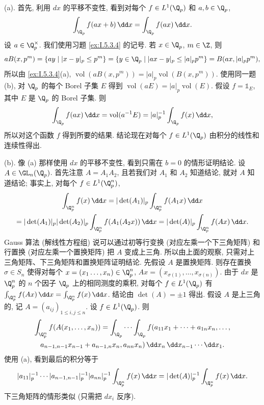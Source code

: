 \begin{solution}
(a). 首先, 利用 $dx$ 的平移不变性, 看到对每个 $f \in L^1(\Q_p)$ 和 $a, b \in \Q_p$,
\[
\int_{\Q_p}f(ax + b)\,\dd x = \int_{\Q_p}f(ax)\,\dd x.
\]
设 $a \in \Q_p^{\times}$. 我们使用习题 \ref{ex:I.5.3.4} 的记号. 若 $x \in \Q_p$, $m \in \Z$, 则
\[
aB(x, p^m) = \{ay \mid |x - y|_p \leq p^m\} = \{y \in \Q_p \mid |ax - y|_p \leq |a|_pp^m\} = B(ax, |a|_pp^m),
\]
所以由 \ref{ex:I.5.3.4}(a), $\operatorname{vol}(aB(x, p^m)) = |a|_p\operatorname{vol}(B(x, p^m))$. 使用同一题 (b), 对 $\Q_p$ 的每个 Borel 子集 $E$ 得到 $\operatorname{vol}(aE) = |a|_p\operatorname{vol}(E)$. 假设 $f = \mathbb{1}_E$, 其中 $E$ 是 $\Q_p$ 的 Borel 子集. 则
\[
\int_{\Q_p}f(ax)\,\dd x = \operatorname{vol}(a^{-1}E) = |a|_p^{-1}\int_{\Q_p}f(x)\,\dd x,
\]
所以对这个函数 $f$ 得到所要的结果. 结论现在对每个 $f \in L^1(\Q_p)$ 由积分的线性和连续性得出.

(b). 像 (a) 那样使用 $dx$ 的平移不变性, 看到只需在 $b = 0$ 的情形证明结论. 设 $A \in \GL_n(\Q_p)$. 首先注意 $A = A_1A_2$, 且若我们对 $A_1$ 和 $A_2$ 知道结论, 就对 $A$ 知道结论; 事实上, 对每个 $f \in L^1(\Q_p^n)$,
\begin{multline*}
\int_{\Q_p^n}f(x)\,\dd x = |\det(A_1)|_p\int_{\Q_p^n}f(A_1x)\,\dd x \\
= |\det(A_1)|_p|\det(A_2)|_p\int_{\Q_p^n}f(A_1(A_2x))\,\dd x = |\det(A)|_p\int_{\Q_p^n}f(Ax)\,\dd x.
\end{multline*}
Gauss 算法 (解线性方程组) 说可以通过初等行变换 (对应左乘一个下三角矩阵) 和行置换 (对应左乘一个置换矩阵) 把 $A$ 变成上三角. 所以由上面的观察, 只需对上三角矩阵、下三角矩阵和置换矩阵证明结论.
先假设 $A$ 是置换矩阵. 则存在置换 $\sigma \in S_n$ 使得对每个 $x = (x_1 \ldots, x_n) \in \Q_p^n$, $Ax = (x_{\sigma(1)}, \ldots, x_{\sigma(n)})$. 由于 $dx$ 是 $\Q_p^n$ 的 $n$ 个因子 $\Q_p$ 上的相同测度的乘积, 对每个 $f \in L^1(\Q_p)$ 有 $\int_{\Q_p^n}f(Ax)\,\dd x = \int_{\Q_p^n}f(x)\,\dd x$. 结论由 $\det(A) = \pm 1$ 得出.
假设 $A$ 是上三角的, 记 $A = (a_{ij})_{1 \leq i,j \leq n}$. 设 $f \in L^1(\Q_p)$. 则
\begin{multline*}
\int_{\Q_p^n}f(A(x_1, \ldots, x_n)) = \int_{\Q_p}\cdots\int_{\Q_p}f(a_{11}x_1 + \cdots + a_{1n}x_n, \ldots, \\
a_{n-1,n-1}x_{n-1} + a_{n-1,n}x_n, a_{nn}x_n)\,\dd x_n\,\dd x_{n-1}\cdots\dd x_1.
\end{multline*}
使用 (a), 看到最后的积分等于
\[
|a_{11}|_p^{-1}\cdots|a_{n-1,n-1}|_p^{-1}|a_{nn}|_p^{-1}\int_{\Q_p^n}f(x)\,\dd x = |\det(A)|_p^{-1}\int_{\Q_p^n}f(x)\,\dd x.
\]
下三角矩阵的情形类似 (只需把 $dx_i$ 反序).


\end{solution}
